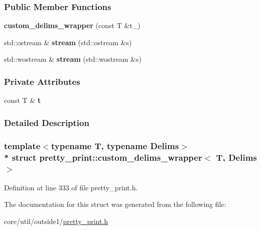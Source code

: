 \subsubsection*{Public Member Functions}
\begin{DoxyCompactItemize}
\item 
{\bfseries custom\+\_\+delims\+\_\+wrapper} (const T \&t\+\_\+)\hypertarget{structpretty__print_1_1custom__delims__wrapper_a834f2b1779f2a832207def729955ee94}{}\label{structpretty__print_1_1custom__delims__wrapper_a834f2b1779f2a832207def729955ee94}

\item 
std\+::ostream \& {\bfseries stream} (std\+::ostream \&s)\hypertarget{structpretty__print_1_1custom__delims__wrapper_a29f5e10e26cf68312d14e2ecf446c42a}{}\label{structpretty__print_1_1custom__delims__wrapper_a29f5e10e26cf68312d14e2ecf446c42a}

\item 
std\+::wostream \& {\bfseries stream} (std\+::wostream \&s)\hypertarget{structpretty__print_1_1custom__delims__wrapper_a9f43467cfdc2714e9770c9a72e09896d}{}\label{structpretty__print_1_1custom__delims__wrapper_a9f43467cfdc2714e9770c9a72e09896d}

\end{DoxyCompactItemize}
\subsubsection*{Private Attributes}
\begin{DoxyCompactItemize}
\item 
const T \& {\bfseries t}\hypertarget{structpretty__print_1_1custom__delims__wrapper_a916612d2cadadde490c8ae65e24743fa}{}\label{structpretty__print_1_1custom__delims__wrapper_a916612d2cadadde490c8ae65e24743fa}

\end{DoxyCompactItemize}


\subsubsection{Detailed Description}
\subsubsection*{template$<$typename T, typename Delims$>$\\*
struct pretty\+\_\+print\+::custom\+\_\+delims\+\_\+wrapper$<$ T, Delims $>$}



Definition at line 333 of file pretty\+\_\+print.\+h.



The documentation for this struct was generated from the following file\+:\begin{DoxyCompactItemize}
\item 
core/util/outside1/\hyperlink{pretty__print_8h}{pretty\+\_\+print.\+h}\end{DoxyCompactItemize}
